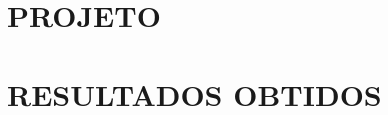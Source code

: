 \documentclass[12pt,floatnumber=continuous,espaco=umemeio]{abnt}
\begin{document}
 
	
	\capa 
	\folhaderosto 
	
	
  
	
	\indices

	
	
	
	
	
	\chapter{PROJETO}
	\label{chp:projeto}
	
	\chapter{RESULTADOS OBTIDOS}
	\label{chp:resultadosObtidos}
	
	
	 
	
\end{document}
